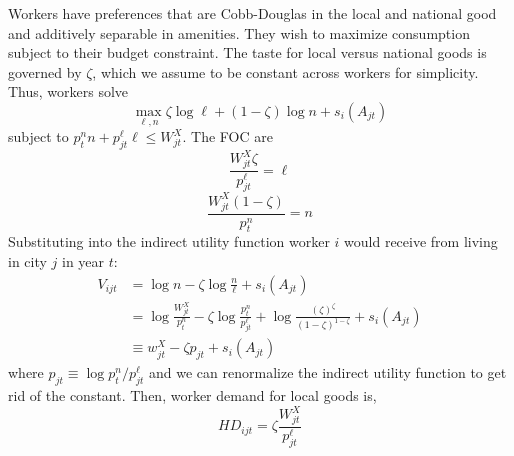 \documentclass{article}
\begin{document}
Workers have preferences that are Cobb-Douglas in  the local and national good and additively separable in amenities. They wish to maximize consumption subject to their budget constraint. The taste for local versus national goods is governed by $\zeta$, which we assume to be constant across workers for simplicity. Thus, workers solve 
\begin{equation}\label{eq_worker_util_max}
    \max_{\ell,n} \zeta \log \ell + (1-\zeta)\log n + s_i(A_{jt})
\end{equation}
subject to $p^n_t n + p^\ell_{jt}\ell\leq W^X_{jt}$. The FOC are
$$\frac{W^X_{jt}\zeta}{p^\ell_{jt}} = \ell$$
$$\frac{W^X_{jt}(1-\zeta)}{p^n_t} = n$$
Substituting into the indirect utility function worker $i$ would receive from living in city $j$ in year $t$:
\begin{align}
    V_{ijt} &= \log n - \zeta \log \frac{n}{\ell} + s_i(A_{jt}) \nonumber \\ 
    &= \log \frac{W^X_{jt}}{p^n_{t}} - \zeta \log\frac{p^n_{t}}{p^\ell_{jt}} + \log\frac{(\zeta)^\zeta}{(1-\zeta)^{1-\zeta}} + s_i(A_{jt})  \nonumber \\
    &\equiv w^X_{jt} - \zeta p_{jt} + s_i(A_{jt})
\end{align}
where $p_{jt} \equiv \log p_t^n/p_{jt}^\ell$ and we can renormalize the indirect utility function to get rid of the constant.
Then, worker demand for local goods is,
\begin{equation}\label{eq_worker_local_demand}
    HD_{ijt} = \zeta \frac{W^X_{jt}}{p^\ell_{jt}}
\end{equation}

 
\end{document}
